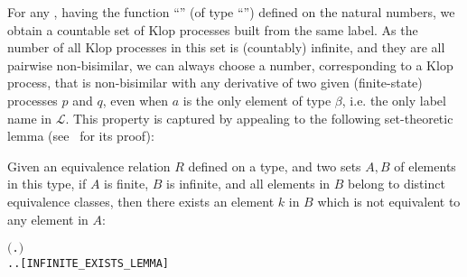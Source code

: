 For any , having the function ``'' (of type ``'')
defined on the natural numbers, we obtain a countable set of Klop processes built from the same label.
As the number of all Klop processes in this set is (countably) infinite, and
they are all pairwise non-bisimilar, %
we can always choose a number, corresponding to a Klop process,
that is non-bisimilar with any derivative of two given 
 (finite-state) processes $p$ and $q$,
even when $a$ is the only element of type $\beta$, i.e. the only label name
in $\mathscr{L}$.
This property is captured by appealing to the following set-theoretic %
lemma (see~\cite{Tian:2017wrba} for its proof): %
\begin{lemma}
Given an equivalence relation $R$ defined on a type, and two sets $A, B$
of elements in this type, 
if $A$ is finite, $B$ is infinite, and all elements
in $B$ belong to distinct equivalence classes, then there exists an element $k$ in $B$
which is not equivalent to any element in $A$:
\begin{alltt}
\HOLTokenTurnstile{}   \HOLSymConst{\HOLTokenImp{}}
     \HOLSymConst{\HOLTokenConj{}}   \HOLSymConst{\HOLTokenConj{}} \ensuremath{(}\HOLSymConst{\HOLTokenForall{}} .  \HOLSymConst{\HOLTokenIn{}}  \HOLSymConst{\HOLTokenConj{}}  \HOLSymConst{\HOLTokenIn{}}  \HOLSymConst{\HOLTokenConj{}}  \HOLSymConst{\HOLTokenNotEqual{}}  \HOLSymConst{\HOLTokenImp{}} \HOLSymConst{\HOLTokenNeg{}}  \ensuremath{)} \HOLSymConst{\HOLTokenImp{}}
   \HOLSymConst{\HOLTokenExists{}}.  \HOLSymConst{\HOLTokenIn{}}  \HOLSymConst{\HOLTokenConj{}} \HOLSymConst{\HOLTokenForall{}}.  \HOLSymConst{\HOLTokenIn{}}  \HOLSymConst{\HOLTokenImp{}} \HOLSymConst{\HOLTokenNeg{}}  \hfill[INFINITE_EXISTS_LEMMA]
\end{alltt}
\end{lemma}

